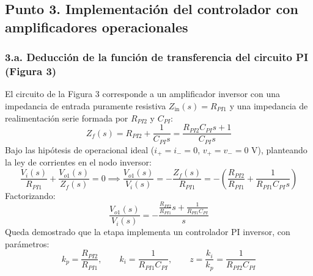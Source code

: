 \documentclass[11pt,a4paper]{article}
\begin{document}
\subsection*{Punto 3. Implementación del controlador con amplificadores operacionales}

\subsubsection*{3.a. Deducción de la función de transferencia del circuito PI (Figura 3)}
El circuito de la Figura 3 corresponde a un amplificador inversor con una impedancia de entrada puramente resistiva $Z_{\text{in}}(s) = R_{PI1}$ y una impedancia de realimentación serie formada por $R_{PI2}$ y $C_{PI}$:
\begin{equation}
    Z_f(s) = R_{PI2} + \frac{1}{C_{PI} s} = \frac{R_{PI2} C_{PI} s + 1}{C_{PI} s}
\end{equation}
Bajo las hipótesis de operacional ideal ($i_+ = i_- = 0$, $v_+ = v_- = 0\text{ V}$), planteando la ley de corrientes en el nodo inversor:
\begin{equation}
    \frac{V_i(s)}{R_{PI1}} + \frac{V_{o1}(s)}{Z_f(s)} = 0 \implies \frac{V_{o1}(s)}{V_i(s)} = -\frac{Z_f(s)}{R_{PI1}} = -\left( \frac{R_{PI2}}{R_{PI1}} + \frac{1}{R_{PI1} C_{PI} s} \right)
\end{equation}
Factorizando:
\begin{equation}
    \frac{V_{o1}(s)}{V_i(s)} = -\frac{\frac{R_{PI2}}{R_{PI1}} s + \frac{1}{R_{PI1} C_{PI}}}{s}
\end{equation}
Queda demostrado que la etapa implementa un controlador PI inversor, con parámetros:
\begin{equation}
    k_p = \frac{R_{PI2}}{R_{PI1}}, \qquad k_i = \frac{1}{R_{PI1} C_{PI}}, \qquad z = \frac{k_i}{k_p} = \frac{1}{R_{PI2} C_{PI}}
\end{equation}
\end{document}
